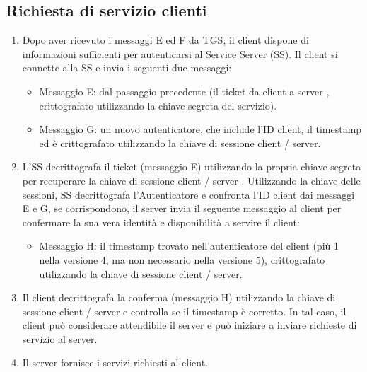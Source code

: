 \subsection{Richiesta di servizio clienti}
\begin{enumerate}
    \item Dopo aver ricevuto i messaggi E ed F da TGS, il client dispone di informazioni sufficienti per autenticarsi al Service Server (SS). Il client si connette alla SS e invia i seguenti due messaggi:
    
    \begin{itemize}
        \item Messaggio E: dal passaggio precedente (il ticket da client a server , crittografato utilizzando la chiave segreta del servizio).
        
        \item Messaggio G: un nuovo autenticatore, che include l'ID client, il timestamp ed è crittografato utilizzando la chiave di sessione client / server.
    \end{itemize}
    
    \item L'SS decrittografa il ticket (messaggio E) utilizzando la propria chiave segreta per recuperare la chiave di sessione client / server . Utilizzando la chiave delle sessioni, SS decrittografa l'Autenticatore e confronta l'ID client dai messaggi E e G, se corrispondono, il server invia il seguente messaggio al client per confermare la sua vera identità e disponibilità a servire il client:
    
    \begin{itemize}
        \item Messaggio H: il timestamp trovato nell'autenticatore del client (più 1 nella versione 4, ma non necessario nella versione 5), crittografato utilizzando la chiave di sessione client / server.
    \end{itemize}
    
    \item Il client decrittografa la conferma (messaggio H) utilizzando la chiave di sessione client / server e controlla se il timestamp è corretto. In tal caso, il client può considerare attendibile il server e può iniziare a inviare richieste di servizio al server.
    
    \item Il server fornisce i servizi richiesti al client.
\end{enumerate}
